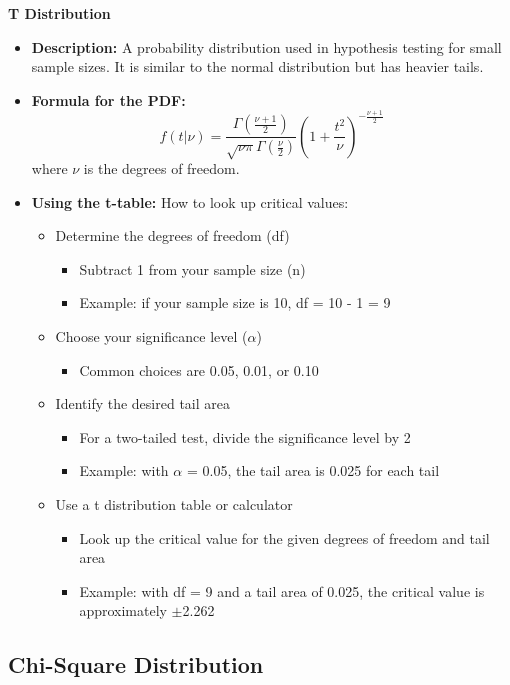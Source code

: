 \documentclass{article}
\begin{document}
\textbf{T Distribution}
\begin{itemize}
    \item \textbf{Description:} A probability distribution used in hypothesis testing for small sample sizes. It is similar to the normal distribution but has heavier tails.
    \item \textbf{Formula for the PDF:}
    \[
    f(t| \nu) = \frac{\Gamma(\frac{\nu+1}{2})}{\sqrt{\nu \pi} \Gamma(\frac{\nu}{2})} \left(1 + \frac{t^2}{\nu}\right)^{-\frac{\nu+1}{2}}
    \]
    where \(\nu\) is the degrees of freedom.
    \item \textbf{Using the t-table:} How to look up critical values:
    \begin{itemize}
    \item Determine the degrees of freedom (df)
    \begin{itemize}
        \item Subtract 1 from your sample size (n)
        \item Example: if your sample size is 10, df = 10 - 1 = 9
    \end{itemize}
    \item Choose your significance level ($\alpha$)
    \begin{itemize}
        \item Common choices are 0.05, 0.01, or 0.10
    \end{itemize}
    \item Identify the desired tail area
    \begin{itemize}
        \item For a two-tailed test, divide the significance level by 2
        \item Example: with $\alpha$ = 0.05, the tail area is 0.025 for each tail
    \end{itemize}
    \item Use a t distribution table or calculator
    \begin{itemize}
        \item Look up the critical value for the given degrees of freedom and tail area
        \item Example: with df = 9 and a tail area of 0.025, the critical value is approximately $\pm$2.262
    \end{itemize}
\end{itemize}

\end{itemize}

\subsection*{Chi-Square Distribution}
\end{document}
